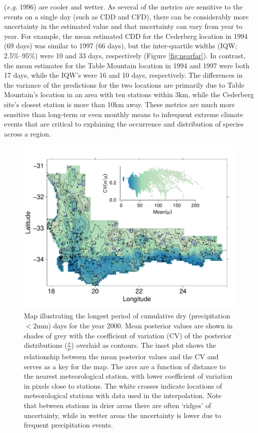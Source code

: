 \documentclass[12pt]{article}
\begin{document}
(\textit{e.g.} 1996) are cooler and wetter.
As several of the metrics are sensitive to the events on a single day
(such as CDD and CFD), there can be considerably more uncertainty in
the estimated value and that uncertainty can vary from year to year.
For example, the mean estimated CDD for the Cederberg location in 1994
(69 days) was similar to 1997 (66 days), but the
inter-quartile widths (IQW; 2.5\%--95\%) were 10 and 33 days, respectively
(Figure \ref{fig:nearfar}). In contrast, the mean estimates for the Table Mountain
location in 1994 and 1997 were both 17 days, while the IQW's were 16
and 10 days, respectively.  
The differences in the variance of the predictions for the two
locations are primarily due to Table Mountain's location in an area with
ten stations within 3km, while the Cederberg site's closest station is
more than 10km away.  
These metrics are much more sensitive  than long-term or even monthly means to infrequent extreme climate
events that are critical to explaining the occurrence and distribution of species across a region. 

     \begin{figure}
  \includegraphics[width=\textwidth]{Figure5.pdf} \caption{Map
    illustrating the longest period of cumulative dry (precipitation
    $<2$mm) days for the year 2000. Mean posterior values are shown in
    shades of grey with the coefficient of variation (CV) of the posterior
    distributions ($\frac{\sigma}{\mu}$) overlaid as contours.
    The inset plot shows the relationship between the mean
    posterior values and the CV and serves as a key for the map. 
    The arcs are a function of distance to the
    nearest meteorological station, with lower coefficient of variation in pixels close to
    stations.  
    The white crosses indicate locations of
    meteorological stations with data used in the interpolation. Note
    that between stations in drier areas there are often `ridges' of
    uncertainty, while in wetter areas the uncertainty is lower due to
    frequent precipitation events. }
     \label{fig:CDD}
\end{figure}
\end{document}
